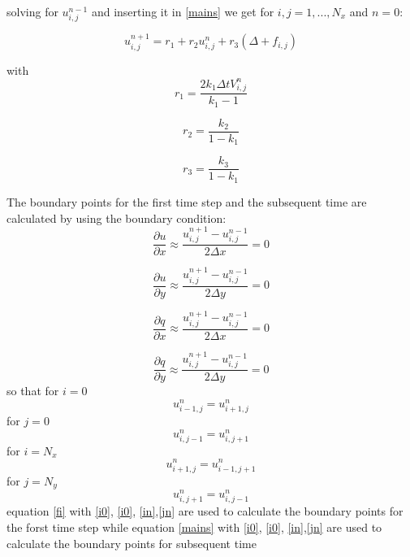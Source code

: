 \documentclass[10pt,a4paper]{report}
\begin{document}
solving for $u_{i,j}^{n-1}$ and inserting it in \ref{mains} we get for
 $i,j = 1,...,N_{x}$ and $n=0$:
 
 \begin{equation}\label{fi}
 u_{i,j}^{n+1} = r_{1}+r_{2}u_{i,j}^{n}+r_{3}(\Delta +f_{i,j})
 \end{equation}
 
 with 
 \begin{equation}
 r_{1} = \frac{2k_{1}\Delta t V_{i,j}^{n}}{k_{1}-1} \nonumber
 \end{equation}
 
 \begin{equation}
 r_{2} = \frac{k_{2}}{1-k_{1}}\nonumber
 \end{equation}
 
 \begin{equation}
 r_{3} = \frac{k_{3}}{1-k_{1}}\nonumber
 \end{equation}
 
 The boundary points for the first time step and the subsequent time are calculated by using the boundary condition:
 \begin{equation}
\frac{\partial u}{\partial x} \approx  \frac{ u_{i,j}^{n+1}-u_{i,j}^{n-1}}{2\Delta x}  = 0 \nonumber
\end{equation}

\begin{equation}
\frac{\partial u}{\partial y} \approx  \frac{ u_{i,j}^{n+1}-u_{i,j}^{n-1}}{2\Delta y}  = 0 \nonumber
\end{equation}

\begin{equation}
\frac{\partial q}{\partial x} \approx  \frac{ u_{i,j}^{n+1}-u_{i,j}^{n-1}}{2\Delta x}  = 0 \nonumber
\end{equation}

\begin{equation}
\frac{\partial q}{\partial y} \approx  \frac{ u_{i,j}^{n+1}-u_{i,j}^{n-1}}{2\Delta y}  = 0 \nonumber
\end{equation}
so that for $i=0$
\begin{equation}\label{i0}
u_{i-1,j}^{n} = u_{i+1,j}^{n} 
\end{equation}
for $j=0$
\begin{equation}\label{j0}
u_{i,j-1}^{n} = u_{i,j+1}^{n} 
\end{equation}
for $i=N_{x}$
\begin{equation}\label{in}
u_{i+1,j}^{n} = u_{i-1,j+1}^{n} 
\end{equation}
for $j=N_{y}$
\begin{equation}\label{jn}
u_{i,j+1}^{n} = u_{i,j-1}^{n} 
\end{equation}
equation \ref{fi} with \ref{i0}, \ref{i0}, \ref{in},\ref{jn} are used to calculate the boundary points for the forst time step while
equation \ref{mains} with \ref{i0}, \ref{i0}, \ref{in},\ref{jn} are used to calculate the boundary points for subsequent time
\end{document}
